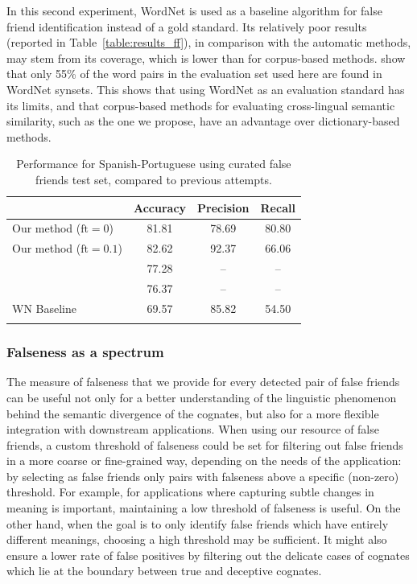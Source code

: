 \documentclass[output=paper]{langsci/langscibook}
\begin{document}
In this second experiment, WordNet is used as a baseline algorithm for false friend identification instead of a gold standard. Its relatively poor results (reported in Table~\ref{table:results_ff}), in comparison with the automatic methods, may stem from its coverage, which is lower than for corpus-based methods. \citet{cognatesuban:castro2018high} show that only 55\% of the word pairs in the evaluation set used here are found in WordNet synsets. This shows that using WordNet as an evaluation standard has its limits, and that corpus-based methods for evaluating cross-lingual semantic similarity, such as the one we propose, have an advantage over dictionary-based methods.

\begin{table}
\begin{tabular}{lccc}

\lsptoprule
& Accuracy & Precision & Recall\\
\midrule

Our method ($\text{ft}=0$) & 81.81 & 78.69 & 80.80 \\
Our method ($\text{ft}=0.1$) & 82.62 & 92.37 & 66.06 \\
\midrule
\citet{cognatesuban:castro2018high} & 77.28 & --  & -- \\
\citet{cognatesuban:torres2011using} & 76.37 & -- & -- \\
WN Baseline & 69.57 & 85.82 & 54.50 \\
\lspbottomrule
\end{tabular}
\caption{\label{table:exp1}Performance for Spanish-Portuguese using curated false friends test set, compared to previous attempts.}
\end{table}

\subsubsection{Falseness as a spectrum}
The measure of falseness that we provide for every detected pair of false friends can be useful not only for a better understanding of the linguistic phenomenon behind the semantic divergence of the cognates, but also for a more flexible integration with downstream applications. When using our resource of false friends, a custom threshold of falseness could be set for filtering out false friends in a more coarse or fine-grained way, depending on the needs of the application: by selecting as false friends only pairs with falseness above a specific (non-zero) threshold. For example, for applications where capturing subtle changes in meaning is important, maintaining a low threshold of falseness is useful. On the other hand, when the goal is to only identify false friends which have entirely different meanings, choosing a high threshold may be sufficient. It might also ensure a lower rate of false positives by filtering out the delicate cases of cognates which lie at the boundary between true and deceptive cognates.\largerpage
\end{document}
